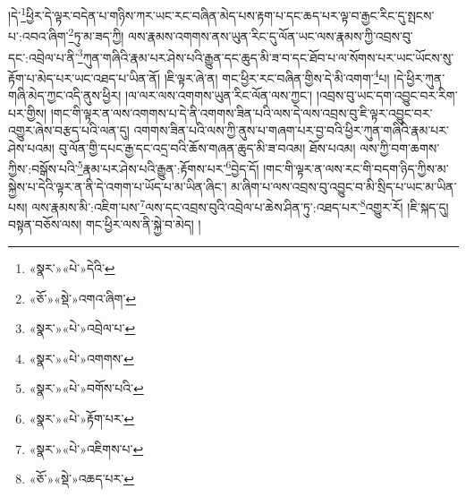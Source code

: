 །དེ་\footnote{«སྣར་»«པེ་»དེའི་}ཕྱིར་དེ་ལྟར་བདེན་པ་གཉིས་ཀར་ཡང་རང་བཞིན་མེད་པས་རྟག་པ་དང་ཆད་པར་ལྟ་བ་རྒྱང་རིང་དུ་སྤངས་པ་:འབའ་ཞིག་\footnote{«ཅོ་»«སྡེ་»འགའ་ཞིག་}ཏུ་མ་ཟད་ཀྱི། ལས་རྣམས་འགགས་ནས་ཡུན་རིང་དུ་ལོན་ཡང་ལས་རྣམས་ཀྱི་འབྲས་བུ་དང་:འབྲེལ་པ་ནི་\footnote{«སྣར་»«པེ་»འབྲེལ་པ་}ཀུན་གཞིའི་རྣམ་པར་ཤེས་པའི་རྒྱུན་དང་ཆུད་མི་ཟ་བ་དང་ཐོབ་པ་ལ་སོགས་པར་ཡང་ཡོངས་སུ་རྟོག་པ་མེད་པར་ཡང་འཐད་པ་ཡིན་ནོ། །ཇི་ལྟར་ཞེ་ན། གང་ཕྱིར་རང་བཞིན་གྱིས་དེ་མི་འགག་\footnote{«སྣར་»«པེ་»འགགས་}པ། །དེ་ཕྱིར་ཀུན་གཞི་མེད་ཀྱང་འདི་ནུས་ཕྱིར། །ལ་ལར་ལས་འགགས་ཡུན་རིང་ལོན་ལས་ཀྱང་། །འབྲས་བུ་ཡང་དག་འབྱུང་བར་རིག་པར་གྱིས། །གང་གི་ལྟར་ན་ལས་འགགས་པ་དེ་ནི་འགགས་ཟིན་པའི་ལས་དེ་ལས་འབྲས་བུ་ཇི་ལྟར་འབྱུང་བར་འགྱུར་ཞེས་བརྩད་པའི་ལན་དུ། འགགས་ཟིན་པའི་ལས་ཀྱི་ནུས་པ་གཞག་པར་བྱ་བའི་ཕྱིར་ཀུན་གཞིའི་རྣམ་པར་ཤེས་པའམ། བུ་ལོན་གྱི་དཔང་རྒྱ་དང་འདྲ་བའི་ཆོས་གཞན་ཆུད་མི་ཟ་བའམ། ཐོས་པའམ། ལས་ཀྱི་བག་ཆགས་ཀྱིས་:བསྒོས་པའི་\footnote{«སྣར་»«པེ་»བགོས་པའི་}རྣམ་པར་ཤེས་པའི་རྒྱུན་:རྟོགས་པར་\footnote{«སྣར་»«པེ་»རྟོག་པར་}བྱེད་དོ། །གང་གི་ལྟར་ན་ལས་རང་གི་བདག་ཉིད་ཀྱིས་མ་སྐྱེས་པ་དེའི་ལྟར་ན་ནི་དེ་འགག་པ་ཡོད་པ་མ་ཡིན་ཞིང་། མ་ཞིག་པ་ལས་འབྲས་བུ་འབྱུང་བ་མི་སྲིད་པ་ཡང་མ་ཡིན་པས། ལས་རྣམས་མི་:འཇིག་པས་\footnote{«སྣར་»«པེ་»འཇིགས་པ་}ལས་དང་འབྲས་བུའི་འབྲེལ་པ་ཆེས་ཤིན་ཏུ་:འཐད་པར་\footnote{«ཅོ་»«སྡེ་»འཆད་པར་}འགྱུར་རོ། །ཇི་སྐད་དུ། བསྟན་བཅོས་ལས། གང་ཕྱིར་ལས་ནི་སྐྱེ་བ་མེད། །
